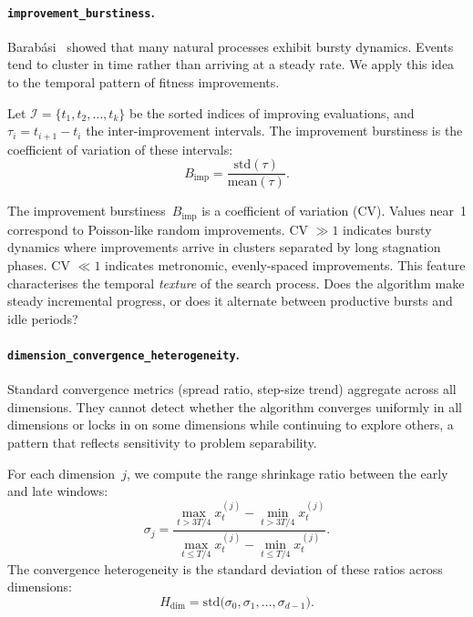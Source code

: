 \paragraph{\texttt{improvement\_burstiness}.}
\label{sec:features:novel:burst}

Barab\'asi~\cite{barabasi2005bursts} showed that many natural processes exhibit bursty dynamics. Events tend to cluster in time rather than arriving at a steady rate.
We apply this idea to the temporal pattern of fitness improvements.

Let $\mathcal{I} = \{t_1, t_2, \ldots, t_k\}$ be the sorted indices of
improving evaluations, and $\tau_i = t_{i+1} - t_i$ the inter-improvement
intervals.  The improvement burstiness is the coefficient of variation of these
intervals:
\begin{equation}
\label{eq:burst}
  B_{\mathrm{imp}}
    = \frac{\mathrm{std}(\tau)}{\mathrm{mean}(\tau)}.
\end{equation}

The improvement burstiness~$B_{\mathrm{imp}}$ is a coefficient of
variation (CV).  Values near~1 correspond to Poisson-like random
improvements.  CV $\gg 1$ indicates bursty dynamics where improvements arrive
in clusters separated by long stagnation phases.  CV $\ll 1$ indicates
metronomic, evenly-spaced improvements.  This feature characterises the
temporal \emph{texture} of the search process. Does the algorithm make steady
incremental progress, or does it alternate between productive bursts and idle
periods?

\paragraph{\texttt{dimension\_convergence\_heterogeneity}.}
\label{sec:features:novel:dimhet}

Standard convergence metrics (spread ratio, step-size trend) aggregate across
all dimensions.  They cannot detect whether the algorithm converges uniformly
in all dimensions or locks in on some dimensions while continuing to explore
others, a pattern that reflects sensitivity to problem separability.

For each dimension~$j$, we compute the range shrinkage ratio between the early
and late windows:
\begin{equation}
\label{eq:shrinkage}
  \sigma_j
    = \frac{\max_{t > 3T/4} x_t^{(j)} - \min_{t > 3T/4} x_t^{(j)}}
           {\max_{t \le T/4} x_t^{(j)} - \min_{t \le T/4} x_t^{(j)}}.
\end{equation}
The convergence heterogeneity is the standard deviation of these ratios across
dimensions:
\begin{equation}
\label{eq:dimhet}
  H_{\mathrm{dim}}
    = \mathrm{std}\!\bigl(\sigma_0, \sigma_1,
      \ldots, \sigma_{d-1}\bigr).
\end{equation}

